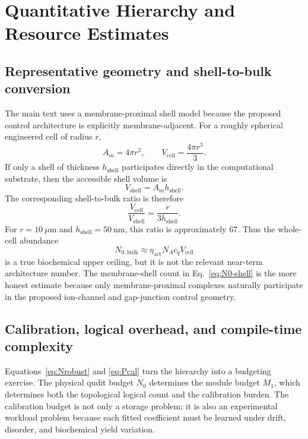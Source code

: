 \documentclass[11pt]{report}
\theoremstyle{definition}
\begin{document}
\chapter{Quantitative Hierarchy and Resource Estimates}

\section{Representative geometry and shell-to-bulk conversion}
The main text uses a membrane-proximal shell model because the proposed control architecture is explicitly membrane-adjacent. For a roughly spherical engineered cell of radius $r$,
\begin{equation}
A_m = 4\pi r^2,
\qquad
V_{\mathrm{cell}} = \frac{4\pi r^3}{3}.
\end{equation}
If only a shell of thickness $h_{\mathrm{shell}}$ participates directly in the computational substrate, then the accessible shell volume is
\begin{equation}
V_{\mathrm{shell}} = A_m h_{\mathrm{shell}}.
\end{equation}
The corresponding shell-to-bulk ratio is therefore
\begin{equation}
\frac{V_{\mathrm{cell}}}{V_{\mathrm{shell}}}
=
\frac{r}{3h_{\mathrm{shell}}}.
\end{equation}
For $r=10~\mu\mathrm{m}$ and $h_{\mathrm{shell}}=50~\mathrm{nm}$, this ratio is approximately $67$. Thus the whole-cell abundance
\begin{equation}
N_{0,\mathrm{bulk}}
\approx
\eta_{\mathrm{act}} N_A c_q V_{\mathrm{cell}}
\end{equation}
is a true biochemical upper ceiling, but it is not the relevant near-term architecture number. The membrane-shell count in Eq.~\eqref{eq:N0-shell} is the more honest estimate because only membrane-proximal complexes naturally participate in the proposed ion-channel and gap-junction control geometry.

\section{Calibration, logical overhead, and compile-time complexity}
Equations~\eqref{eq:Nrobust} and \eqref{eq:Pcal} turn the hierarchy into a budgeting exercise. The physical qudit budget $N_0$ determines the module budget $M_1$, which determines both the topological logical count and the calibration burden. The calibration budget is not only a storage problem; it is also an experimental workload problem because each fitted coefficient must be learned under drift, disorder, and biochemical yield variation.
\end{document}
